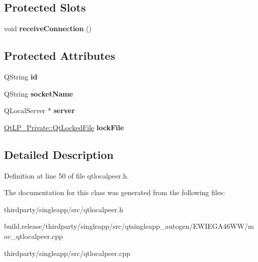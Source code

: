 \subsection*{Protected Slots}
\begin{DoxyCompactItemize}
\item 
\mbox{\label{class_qt_local_peer_afb29397e8af380cac78af0b7535121d2}} 
void {\bfseries receive\+Connection} ()
\end{DoxyCompactItemize}
\subsection*{Protected Attributes}
\begin{DoxyCompactItemize}
\item 
\mbox{\label{class_qt_local_peer_a89ee3139c0e2515e081a2b5de98beda6}} 
Q\+String {\bfseries id}
\item 
\mbox{\label{class_qt_local_peer_a2c86a18c237bdfe4bd0565d3cc413cd8}} 
Q\+String {\bfseries socket\+Name}
\item 
\mbox{\label{class_qt_local_peer_af400ab8eb001ef4790541069a5d0e292}} 
Q\+Local\+Server $\ast$ {\bfseries server}
\item 
\mbox{\label{class_qt_local_peer_ae41ee5934f4e862f0817217ade062e10}} 
\hyperlink{class_qt_l_p___private_1_1_qt_locked_file}{Qt\+L\+P\+\_\+\+Private\+::\+Qt\+Locked\+File} {\bfseries lock\+File}
\end{DoxyCompactItemize}


\subsection{Detailed Description}


Definition at line 50 of file qtlocalpeer.\+h.



The documentation for this class was generated from the following files\+:\begin{DoxyCompactItemize}
\item 
thirdparty/singleapp/src/qtlocalpeer.\+h\item 
build.\+release/thirdparty/singleapp/src/qtsingleapp\+\_\+autogen/\+E\+W\+I\+E\+G\+A46\+W\+W/moc\+\_\+qtlocalpeer.\+cpp\item 
thirdparty/singleapp/src/qtlocalpeer.\+cpp\end{DoxyCompactItemize}
